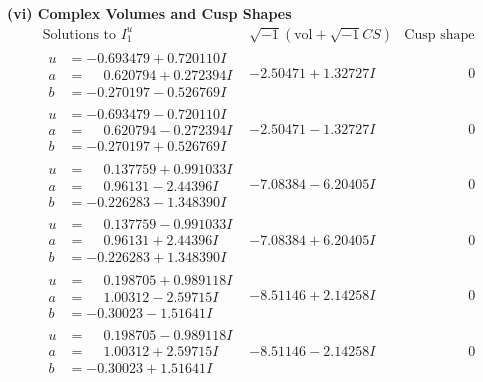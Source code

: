 \documentclass[1p]{elsarticle_modified}
\theoremstyle{definition}
\newcommand{\I}{\sqrt{-1}}
\begin{document}
\newpage\flushleft \textbf{(vi) Complex Volumes and Cusp Shapes}
$$\begin{array}{c|c|c}  
\text{Solutions to }I^u_{1}& \I (\text{vol} + \sqrt{-1}CS) & \text{Cusp shape}\\
 \hline 
\begin{aligned}
u &= -0.693479 + 0.720110 I \\
a &= \phantom{-}0.620794 + 0.272394 I \\
b &= -0.270197 - 0.526769 I\end{aligned}
 & -2.50471 + 1.32727 I & \phantom{-0.000000 } 0 \\ \hline\begin{aligned}
u &= -0.693479 - 0.720110 I \\
a &= \phantom{-}0.620794 - 0.272394 I \\
b &= -0.270197 + 0.526769 I\end{aligned}
 & -2.50471 - 1.32727 I & \phantom{-0.000000 } 0 \\ \hline\begin{aligned}
u &= \phantom{-}0.137759 + 0.991033 I \\
a &= \phantom{-}0.96131 - 2.44396 I \\
b &= -0.226283 - 1.348390 I\end{aligned}
 & -7.08384 - 6.20405 I & \phantom{-0.000000 } 0 \\ \hline\begin{aligned}
u &= \phantom{-}0.137759 - 0.991033 I \\
a &= \phantom{-}0.96131 + 2.44396 I \\
b &= -0.226283 + 1.348390 I\end{aligned}
 & -7.08384 + 6.20405 I & \phantom{-0.000000 } 0 \\ \hline\begin{aligned}
u &= \phantom{-}0.198705 + 0.989118 I \\
a &= \phantom{-}1.00312 - 2.59715 I \\
b &= -0.30023 - 1.51641 I\end{aligned}
 & -8.51146 + 2.14258 I & \phantom{-0.000000 } 0 \\ \hline\begin{aligned}
u &= \phantom{-}0.198705 - 0.989118 I \\
a &= \phantom{-}1.00312 + 2.59715 I \\
b &= -0.30023 + 1.51641 I\end{aligned}
 & -8.51146 - 2.14258 I & \phantom{-0.000000 } 0 \\ \hline\begin{aligned}

\end{aligned}
\end{array}$$
\end{document}
